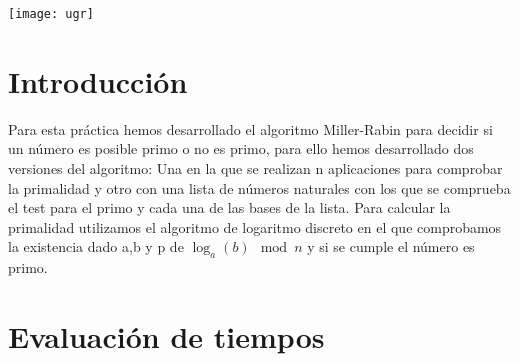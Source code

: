 \texttt{[image: ugr]}

\newpage %

\tableofcontents %



\newpage


\section{Introducción}

Para esta práctica hemos desarrollado el algoritmo Miller-Rabin para decidir si un número es posible primo o no es primo, para ello hemos desarrollado dos versiones del algoritmo: Una en la que se realizan n aplicaciones para comprobar la primalidad y otro con una lista de números naturales con los que se comprueba el test para el primo y cada una de las bases de la lista. Para calcular la primalidad utilizamos el algoritmo de logaritmo discreto en el que comprobamos la existencia dado a,b y p de $\log_a (b) \mod n$ y si se cumple el número es primo.

\section{Evaluación de tiempos}

